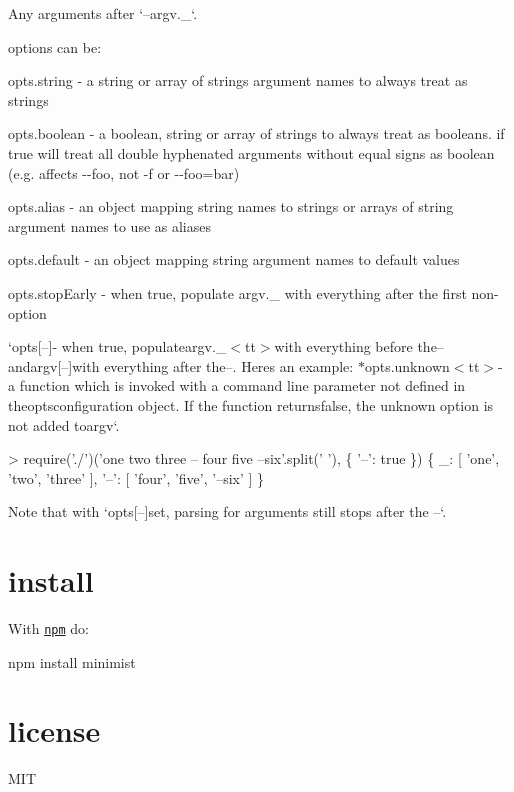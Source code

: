 Any arguments after `\textquotesingle{}--argv.\+\_\+`.

options can be\+:


\begin{DoxyItemize}
\item {\ttfamily opts.\+string} -\/ a string or array of strings argument names to always treat as strings
\item {\ttfamily opts.\+boolean} -\/ a boolean, string or array of strings to always treat as booleans. if {\ttfamily true} will treat all double hyphenated arguments without equal signs as boolean (e.\+g. affects {\ttfamily -\/-\/foo}, not {\ttfamily -\/f} or {\ttfamily -\/-\/foo=bar})
\item {\ttfamily opts.\+alias} -\/ an object mapping string names to strings or arrays of string argument names to use as aliases
\item {\ttfamily opts.\+default} -\/ an object mapping string argument names to default values
\item {\ttfamily opts.\+stop\+Early} -\/ when true, populate {\ttfamily argv.\+\_\+} with everything after the first non-\/option
\item `opts\mbox{[}\textquotesingle{}--\textquotesingle{}\mbox{]}{\ttfamily -\/ when true, populate}argv.\+\_\+$<$tt$>$with everything before the--{\ttfamily  and}argv\mbox{[}\textquotesingle{}--\textquotesingle{}\mbox{]}{\ttfamily with everything after the}--{\ttfamily . Here\textquotesingle{}s an example\+: $\ast$}opts.\+unknown$<$tt$>$-\/ a function which is invoked with a command line parameter not defined in theopts{\ttfamily configuration object. If the function returns}false{\ttfamily , the unknown option is not added to}argv`.
\end{DoxyItemize}


\begin{DoxyCode}
> require('./')('one two three -- four five --six'.split(' '), \{ '--': true \})
\{ \_: [ 'one', 'two', 'three' ],
  '--': [ 'four', 'five', '--six' ] \}
\end{DoxyCode}


Note that with `opts\mbox{[}\textquotesingle{}--\textquotesingle{}\mbox{]}{\ttfamily set, parsing for arguments still stops after the }--`.

\section*{install}

With \href{https://npmjs.org}{\tt npm} do\+:


\begin{DoxyCode}
npm install minimist
\end{DoxyCode}


\section*{license}

M\+IT 